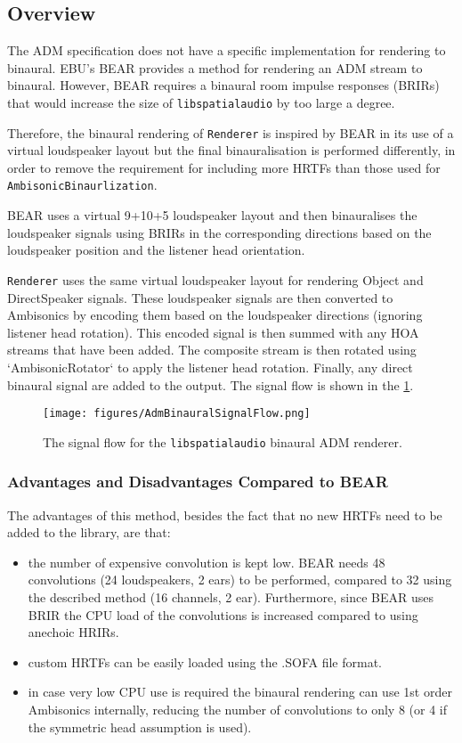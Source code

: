 \documentclass[12pt]{report}
\def\libspataud{\texttt{libspatialaudio}\xspace}
\newcommand{\code}[1]{\texttt{#1}}
\begin{document}
\subsection{Overview}

The ADM specification does not have a specific implementation for rendering to binaural. EBU's BEAR \cite{EBU3369} provides a method for rendering an ADM stream to binaural.
However, BEAR requires a  binaural room impulse responses (BRIRs) that would increase the size of \libspataud by too large a degree.

Therefore, the binaural rendering of \code{Renderer} is inspired by BEAR in its use of a virtual loudspeaker layout but the final binauralisation is performed differently, in order to remove the requirement for including more HRTFs than those used for \code{AmbisonicBinaurlization}.

BEAR uses a virtual 9+10+5 loudspeaker layout and then binauralises the loudspeaker signals using BRIRs in the corresponding directions based on the loudspeaker position and the listener head orientation.

\code{Renderer} uses the same virtual loudspeaker layout for rendering Object and DirectSpeaker signals.
These loudspeaker signals are then converted to Ambisonics by encoding them based on the loudspeaker directions (ignoring listener head rotation).
This encoded signal is then summed with any HOA streams that have been added.
The composite stream is then rotated using `AmbisonicRotator` to apply the listener head rotation.
Finally, any direct binaural signal are added to the output.
The signal flow is shown in the \cref{fig:adm_binaural}.

\begin{figure}
    \centering
    \texttt{[image: figures/AdmBinauralSignalFlow.png]}
    \caption{The signal flow for the \libspataud binaural ADM renderer.}
    \label{fig:adm_binaural}
\end{figure}

\subsubsection{Advantages and Disadvantages Compared to BEAR}

The advantages of this method, besides the fact that no new HRTFs need to be added to the library, are that:
\begin{itemize}
    \item the number of expensive convolution is kept low. BEAR needs 48 convolutions (24 loudspeakers, 2 ears) to be performed, compared to 32 using the described method (16 channels, 2 ear). Furthermore, since BEAR uses BRIR the CPU load of the convolutions is increased compared to using anechoic HRIRs.
    \item custom HRTFs can be easily loaded using the .SOFA file format.
    \item in case very low CPU use is required the binaural rendering can use 1st order Ambisonics internally, reducing the number of convolutions to only 8 (or 4 if the symmetric head assumption is used).
\end{itemize}
\end{document}
